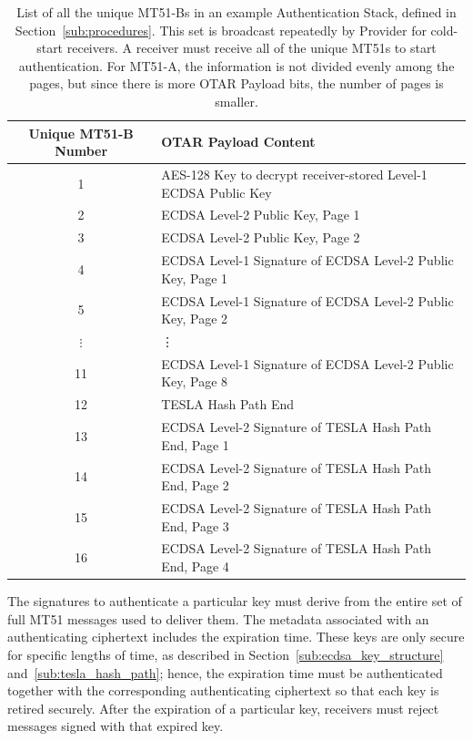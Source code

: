\documentclass[letterpaper,times]{IONconf/IONconf}
\begin{document}
		\begin{table}%
			\center
			\begin{tabular}{|c|l|} \hline
				Unique MT51-B Number & OTAR Payload Content \\ \hline
				1 & AES-128 Key to decrypt receiver-stored Level-1 ECDSA Public Key \\ \hline
				2 & ECDSA Level-2 Public Key, Page 1 \\ \hline
				3 & ECDSA Level-2 Public Key, Page 2 \\ \hline
				4 & ECDSA Level-1 Signature of ECDSA Level-2 Public Key, Page 1 \\ \hline
				5 & ECDSA Level-1 Signature of ECDSA Level-2 Public Key, Page 2 \\ \hline
				$\vdots$ & \vdots \\ \hline
				11 & ECDSA Level-1 Signature of ECDSA Level-2 Public Key, Page 8 \\ \hline
				12 & TESLA Hash Path End \\ \hline
				13 & ECDSA Level-2 Signature of TESLA Hash Path End, Page 1 \\ \hline
				14 & ECDSA Level-2 Signature of TESLA Hash Path End, Page 2 \\ \hline
				15 & ECDSA Level-2 Signature of TESLA Hash Path End, Page 3 \\ \hline
				16 & ECDSA Level-2 Signature of TESLA Hash Path End, Page 4 \\ \hline
			\end{tabular}
			\caption{
				List of all the unique MT51-Bs in an example Authentication Stack, defined in Section~\ref{sub:procedures}.
				This set is broadcast repeatedly by Provider for cold-start receivers.
				A receiver must receive all of the unique MT51s to start authentication.
				For MT51-A, the information is not divided evenly among the pages, but since there is more OTAR Payload bits, the number of pages is smaller. 
			}
			\label{tab: mt51-set}
		\end{table}

		The signatures to authenticate a particular key must derive from the entire set of full MT51 messages used to deliver them.
		The metadata associated with an authenticating ciphertext includes the expiration time.
		These keys are only secure for specific lengths of time, as described in Section~\ref{sub:ecdsa_key_structure} and~\ref{sub:tesla_hash_path}; hence, the expiration time must be authenticated together with the corresponding authenticating ciphertext so that each key is retired securely.
		After the expiration of a particular key, receivers must reject messages signed with that expired key.
\end{document}
